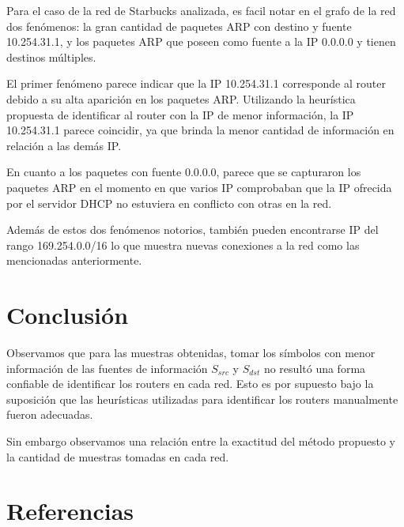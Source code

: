 \documentclass[a4paper, 10pt, twoside]{article}
\begin{document}
Para el caso de la red de Starbucks analizada, es facil notar en el grafo de la red dos fenómenos: la gran cantidad de paquetes ARP con destino y fuente 10.254.31.1, y los paquetes ARP que poseen como fuente a la IP 0.0.0.0 y tienen destinos múltiples.

El primer fenómeno parece indicar que la IP 10.254.31.1 corresponde al router debido a su alta aparición en los paquetes ARP. Utilizando la heurística propuesta de identificar al router con la IP de menor información, la IP 10.254.31.1 parece coincidir, ya que brinda la menor cantidad de información en relación a las demás IP.

En cuanto a los paquetes con fuente 0.0.0.0, parece que se capturaron los paquetes ARP en el momento en que varios IP comprobaban que la IP ofrecida por el servidor DHCP no estuviera en conflicto con otras en la red.

Además de estos dos fenómenos notorios, también pueden encontrarse IP del rango 169.254.0.0/16 lo que muestra nuevas conexiones a la red como las mencionadas anteriormente.




\section{Conclusión}

Observamos que para las muestras obtenidas, tomar los símbolos con menor información de las fuentes de información $S_{src}$ y $S_{dst}$ no resultó una forma confiable de identificar los routers en cada red. Esto es por supuesto bajo la suposición que las heurísticas utilizadas para identificar los routers manualmente fueron adecuadas.

Sin embargo observamos una relación entre la exactitud del método propuesto y la cantidad de muestras tomadas en cada red.




\section{Referencias}
\end{document}
